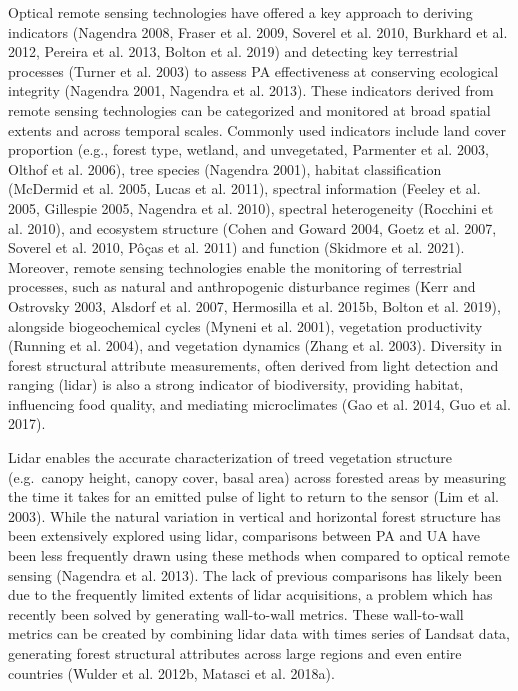 \documentclass[10pt,oneside]{article}
\begin{document}
Optical remote sensing technologies have offered a key approach to
deriving indicators (Nagendra 2008, Fraser et al. 2009, Soverel et al.
2010, Burkhard et al. 2012, Pereira et al. 2013, Bolton et al. 2019) and
detecting key terrestrial processes (Turner et al. 2003) to assess PA
effectiveness at conserving ecological integrity (Nagendra 2001,
Nagendra et al. 2013). These indicators derived from remote sensing
technologies can be categorized and monitored at broad spatial extents
and across temporal scales. Commonly used indicators include land cover
proportion (e.g., forest type, wetland, and unvegetated, Parmenter et
al. 2003, Olthof et al. 2006), tree species (Nagendra 2001), habitat
classification (McDermid et al. 2005, Lucas et al. 2011), spectral
information (Feeley et al. 2005, Gillespie 2005, Nagendra et al. 2010),
spectral heterogeneity (Rocchini et al. 2010), and ecosystem structure
(Cohen and Goward 2004, Goetz et al. 2007, Soverel et al. 2010, Pôças et
al. 2011) and function (Skidmore et al. 2021). Moreover, remote sensing
technologies enable the monitoring of terrestrial processes, such as
natural and anthropogenic disturbance regimes (Kerr and Ostrovsky 2003,
Alsdorf et al. 2007, Hermosilla et al. 2015b, Bolton et al. 2019),
alongside biogeochemical cycles (Myneni et al. 2001), vegetation
productivity (Running et al. 2004), and vegetation dynamics (Zhang et
al. 2003). Diversity in forest structural attribute measurements, often
derived from light detection and ranging (lidar) is also a strong
indicator of biodiversity, providing habitat, influencing food quality,
and mediating microclimates (Gao et al. 2014, Guo et al. 2017).

Lidar enables the accurate characterization of treed vegetation
structure (e.g.~canopy height, canopy cover, basal area) across forested
areas by measuring the time it takes for an emitted pulse of light to
return to the sensor (Lim et al. 2003). While the natural variation in
vertical and horizontal forest structure has been extensively explored
using lidar, comparisons between PA and UA have been less frequently
drawn using these methods when compared to optical remote sensing
(Nagendra et al. 2013). The lack of previous comparisons has likely been
due to the frequently limited extents of lidar acquisitions, a problem
which has recently been solved by generating wall-to-wall metrics. These
wall-to-wall metrics can be created by combining lidar data with times
series of Landsat data, generating forest structural attributes across
large regions and even entire countries (Wulder et al. 2012b, Matasci et
al. 2018a).
\end{document}
